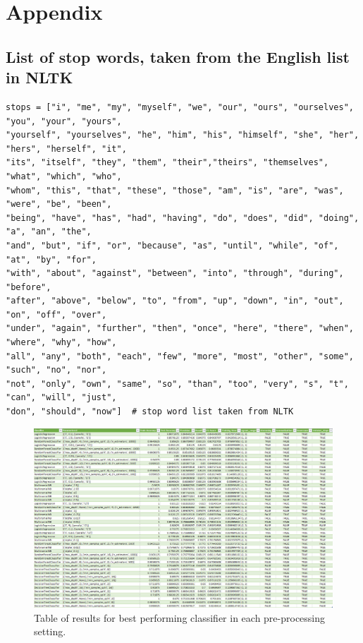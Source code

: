 \documentclass[a4paper, 11pt]{article}
\begin{document}
\appendix

\section{Appendix}
\subsection{List of stop words, taken from the English list in NLTK}
\label{appendix:words}
\begin{lstlisting}
stops = ["i", "me", "my", "myself", "we", "our", "ours", "ourselves", "you", "your", "yours", 
"yourself", "yourselves", "he", "him", "his", "himself", "she", "her", "hers", "herself", "it",
"its", "itself", "they", "them", "their","theirs", "themselves", "what", "which", "who",
"whom", "this", "that", "these", "those", "am", "is", "are", "was", "were", "be", "been", 
"being", "have", "has", "had", "having", "do", "does", "did", "doing", "a", "an", "the",
"and", "but", "if", "or", "because", "as", "until", "while", "of", "at", "by", "for",
"with", "about", "against", "between", "into", "through", "during", "before", 
"after", "above", "below", "to", "from", "up", "down", "in", "out", "on", "off", "over", 
"under", "again", "further", "then", "once", "here", "there", "when", "where", "why", "how",
"all", "any", "both", "each", "few", "more", "most", "other", "some", "such", "no", "nor", 
"not", "only", "own", "same", "so", "than", "too", "very", "s", "t", "can", "will", "just",
"don", "should", "now"]  # stop word list taken from NLTK
\end{lstlisting}

\begin{figure}
    \includegraphics[width=\textwidth]{figures/Untitled.png}
    \caption{Table of results for best performing classifier in each pre-processing setting.}
    \label{apx:results}
\end{figure}
\onecolumn
\end{document}
